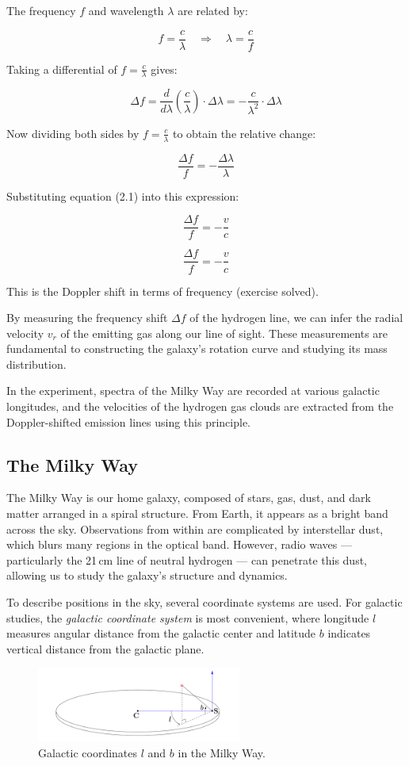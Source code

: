 \documentclass[12pt,a4paper]{article}
\begin{document}
The frequency \( f \) and wavelength \( \lambda \) are related by:

\[
f = \frac{c}{\lambda}
\quad \Rightarrow \quad
\lambda = \frac{c}{f}
\]

Taking a differential of \( f = \frac{c}{\lambda} \) gives:

\[
\Delta f = \frac{d}{d\lambda}\left(\frac{c}{\lambda}\right) \cdot \Delta \lambda 
= -\frac{c}{\lambda^2} \cdot \Delta \lambda
\]

Now dividing both sides by \( f = \frac{c}{\lambda} \) to obtain the relative change:

\[
\frac{\Delta f}{f} = -\frac{\Delta \lambda}{\lambda}
\]

Substituting equation (2.1) into this expression:

\[
\frac{\Delta f}{f} = -\frac{v}{c}
\]

\begin{equation}
\boxed{
\frac{\Delta f}{f} = -\frac{v}{c}
}
\tag{2.2}
\end{equation}

This is the Doppler shift in terms of frequency (exercise solved).

By measuring the frequency shift $\Delta f$ of the hydrogen line, we can infer the radial velocity $v_r$ of the emitting gas along our line of sight. These measurements are fundamental to constructing the galaxy’s rotation curve and studying its mass distribution.
  
  In the experiment, spectra of the Milky Way are recorded at various galactic longitudes, and the velocities of the hydrogen gas clouds are extracted from the Doppler-shifted emission lines using this principle.
   

  \subsection{The Milky Way}

The Milky Way is our home galaxy, composed of stars, gas, dust, and dark matter arranged in a spiral structure. From Earth, it appears as a bright band across the sky. Observations from within are complicated by interstellar dust, which blurs many regions in the optical band. However, radio waves — particularly the 21\,cm line of neutral hydrogen — can penetrate this dust, allowing us to study the galaxy's structure and dynamics.

To describe positions in the sky, several coordinate systems are used. For galactic studies, the \textit{galactic coordinate system} is most convenient, where longitude \( l \) measures angular distance from the galactic center and latitude \( b \) indicates vertical distance from the galactic plane.
\begin{figure}[H]
  \centering
  \includegraphics[width=0.6\textwidth]{Pictures/bl.png}
  \caption{Galactic coordinates \( l \) and \( b \) in the Milky Way.}
  \label{fig:bl}
\end{figure}
\end{document}
